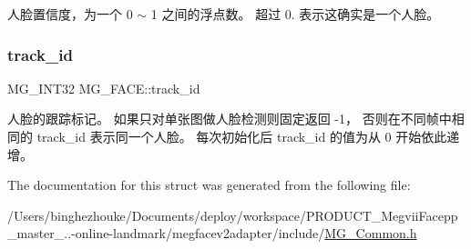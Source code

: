 人脸置信度，为一个 0 $\sim$ 1 之间的浮点数。 超过 0. 表示这确实是一个人脸。 \mbox{\label{struct_m_g___f_a_c_e_a71e1f0316c4696a7a98bd2dfb7b817e0}} 
\subsubsection{\texorpdfstring{track\+\_\+id}{track\_id}}
{\footnotesize\ttfamily M\+G\+\_\+\+I\+N\+T32 M\+G\+\_\+\+F\+A\+C\+E\+::track\+\_\+id}

人脸的跟踪标记。 如果只对单张图做人脸检测则固定返回 -\/1， 否则在不同帧中相同的 track\+\_\+id 表示同一个人脸。 每次初始化后 track\+\_\+id 的值为从 0 开始依此递增。 

The documentation for this struct was generated from the following file\+:\begin{DoxyCompactItemize}
\item 
/\+Users/binghezhouke/\+Documents/deploy/workspace/\+P\+R\+O\+D\+U\+C\+T\+\_\+\+Megvii\+Facepp\+\_\+master\+\_..-\/online-\/landmark/megfacev2adapter/include/\hyperlink{_m_g___common_8h}{M\+G\+\_\+\+Common.\+h}\end{DoxyCompactItemize}
